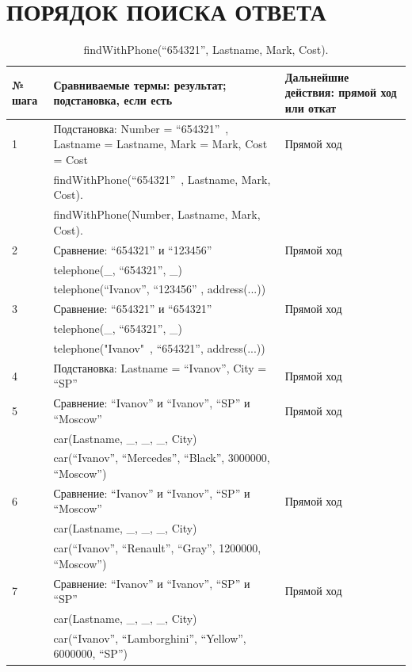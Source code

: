 \section{ПОРЯДОК ПОИСКА ОТВЕТА}

{
\small
\begin{longtable}{|p{1.15cm}|p{8cm}|p{8cm}|}
    \caption{findWithPhone(``654321'', Lastname, Mark, Cost).} \\
    \hline
    № шага & Сравниваемые термы: результат; подстановка, если есть & Дальнейшие действия: прямой ход или откат \\
    \hline
    1 & Подстановка: Number = ``654321''\ , Lastname = Lastname, Mark = Mark, Cost = Cost & Прямой ход \\
      & findWithPhone(``654321''\ , Lastname, Mark, Cost). & \\
      & findWithPhone(Number, Lastname, Mark, Cost). & \\
    \hline
    2 & Сравнение:  ``654321'' и ``123456'' & Прямой ход \\
      & telephone(\_, ``654321'', \_) & \\
      & telephone(``Ivanov'', ``123456'' , address(...)) & \\
    \hline
    3 & Сравнение: ``654321'' и ``654321'' & Прямой ход \\
      & telephone(\_, ``654321'', \_) & \\
      & telephone("Ivanov"\ , ``654321'', address(...)) & \\
    \hline
    4 & Подстановка: Lastname = ``Ivanov'', City = ``SP'' & Прямой ход \\
    \hline
    5 & Сравнение: ``Ivanov'' и ``Ivanov'', ``SP'' и ``Moscow'' & Прямой ход \\
      & car(Lastname, \_, \_, \_, City) & \\
      & car(``Ivanov'', ``Mercedes'', ``Black'', 3000000, ``Moscow'') & \\
    \hline
    6 & Сравнение: ``Ivanov'' и ``Ivanov'', ``SP'' и ``Moscow'' & Прямой ход \\
      & car(Lastname, \_, \_, \_, City) & \\
      & car(``Ivanov'', ``Renault'', ``Gray'', 1200000, ``Moscow'') & \\
    \hline
    7 & Сравнение: ``Ivanov'' и ``Ivanov'', ``SP'' и ``SP'' & Прямой ход \\
      & car(Lastname, \_, \_, \_, City) & \\
      & car(``Ivanov'', ``Lamborghini'', ``Yellow'', 6000000, ``SP'') & \\

\end{longtable}}
